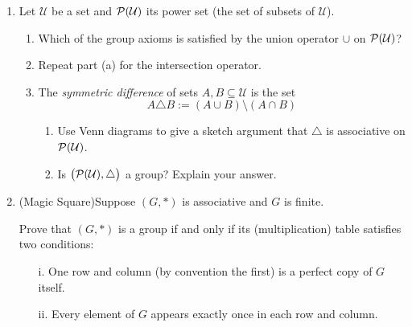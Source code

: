 \begin{exercises}
\begin{enumerate}
	  \item Let $\mathcal U$ be a set and $\mathcal{P}(\mathcal U)$ its power set (the set of subsets of $\mathcal U$).
	  \begin{enumerate}
	    \item Which of the group axioms is satisfied by the union operator $\cup$ on $\mathcal{P}(\mathcal U)$?
	    
	    \item Repeat part (a) for the intersection operator.
	    
	    \item The \emph{symmetric difference} of sets $A,B\subseteq\mathcal U$ is the set
	    \[
	    	A\triangle B:=(A\cup B)\setminus(A\cap B)
	    \]
	    \begin{enumerate}
	      \item Use Venn diagrams to give a sketch argument that $\triangle$ is associative on $\mathcal{P}(\mathcal U)$.
	      
	      \item Is $\bigl(\mathcal{P}(\mathcal U),\triangle\bigr)$ a group? Explain your answer.
	  	\end{enumerate}
	  \end{enumerate}
	  
	  
	  \item\label{exs:magicsquare} (Magic Square)\quad Suppose $(G,*)$ is associative and $G$ is finite.\par
	  Prove that $(G,*)$ is a group if and only if its (multiplication) table satisfies two conditions:
			\begin{itemize}
			  \item[i.] One row and column (by convention the first) is a perfect copy of $G$ itself.
	  		\item[ii.] Every element of $G$ appears exactly once in each row and column.
			\end{itemize}
		

\end{enumerate}
\end{exercises}
